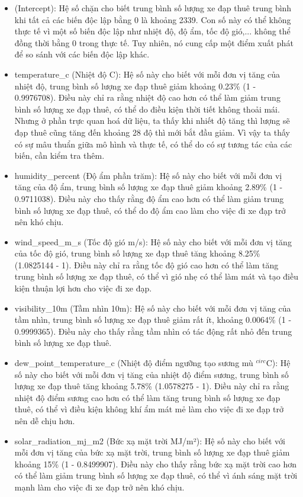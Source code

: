\documentclass[
  11pt,
  letterpaper,
]{article}
\begin{document}
\begin{itemize}
\item (Intercept): Hệ số chặn cho biết trung bình số lượng xe đạp thuê trung bình khi tất cả các biến độc lập bằng 0 là khoảng 2339. Con số này có thể không thực tế vì một số biến độc lập như nhiệt độ, độ ẩm, tốc độ gió,... không thể đồng thời bằng 0 trong thực tế. Tuy nhiên, nó cung cấp một điểm xuất phát để so sánh với các biến độc lập khác.
\item  temperature\_c (Nhiệt độ C): Hệ số này cho biết với mỗi đơn vị tăng của nhiệt độ, trung bình số lượng xe đạp thuê giảm khoảng 0.23\% (1 - 0.9976708). Điều này chỉ ra rằng nhiệt độ cao hơn có thể làm giảm trung bình số lượng xe đạp thuê, có thể do điều kiện thời tiết không thoải mái. Nhưng ở phần trực quan hoá dữ liệu, ta thấy khi nhiết độ tăng thì lượng sẽ đạp thuê cũng tăng đến khoảng 28 độ thì mới bắt đầu giảm. Vì vậy ta thấy có sự mâu thuẩn giữa mô hình và thực tế, có thể do có sự tương tác của các biến, cần kiểm tra thêm. 
\item humidity\_percent (Độ ẩm phần trăm): Hệ số này cho biết với mỗi đơn vị tăng của độ ẩm, trung bình số lượng xe đạp thuê giảm khoảng 2.89\% (1 - 0.9711038). Điều này cho thấy rằng độ ẩm cao hơn có thể làm giảm trung bình số lượng xe đạp thuê, có thể do độ ẩm cao làm cho việc đi xe đạp trở nên khó chịu.
\item wind\_speed\_m\_s (Tốc độ gió m/s): Hệ số này cho biết với mỗi đơn vị tăng của tốc độ gió, trung bình số lượng xe đạp thuê tăng khoảng 8.25\% (1.0825144 - 1). Điều này chỉ ra rằng tốc độ gió cao hơn có thể làm tăng trung bình số lượng xe đạp thuê, có thể vì gió nhẹ có thể làm mát và tạo điều kiện thuận lợi hơn cho việc đi xe đạp.
\item visibility\_10m (Tầm nhìn 10m): Hệ số này cho biết với mỗi đơn vị tăng của tầm nhìn, trung bình số lượng xe đạp thuê giảm rất ít, khoảng 0.0064\% (1 - 0.9999365). Điều này cho thấy rằng tầm nhìn có tác động rất nhỏ đến trung bình số lượng xe đạp thuê.
\item dew\_point\_temperature\_c (Nhiệt độ điểm ngưỡng tạo sương mù $^{circ}$C): Hệ số này cho biết với mỗi đơn vị tăng của nhiệt độ điểm sương, trung bình số lượng xe đạp thuê tăng khoảng 5.78\% (1.0578275 - 1). Điều này chỉ ra rằng nhiệt độ điểm sương cao hơn có thể làm tăng trung bình số lượng xe đạp thuê, có thể vì điều kiện không khí ẩm mát mẻ làm cho việc đi xe đạp trở nên dễ chịu hơn.
\item solar\_radiation\_mj\_m2 (Bức xạ mặt trời MJ/m²): Hệ số này cho biết với mỗi đơn vị tăng của bức xạ mặt trời, trung bình số lượng xe đạp thuê giảm khoảng 15\% (1 - 0.8499907). Điều này cho thấy rằng bức xạ mặt trời cao hơn có thể làm giảm trung bình số lượng xe đạp thuê, có thể vì ánh sáng mặt trời mạnh làm cho việc đi xe đạp trở nên khó chịu.

\end{itemize}
\end{document}
